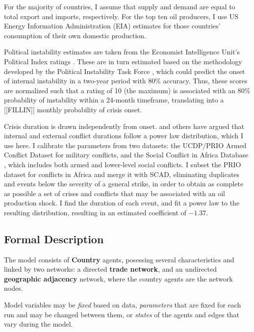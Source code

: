 \documentclass{article}
\begin{document}
For the majority of countries, I assume that supply and demand are equal to total export and imports, respectively. For the top ten oil producers, I use US Energy Information Administration (EIA) estimates \citep{eia_2013} for those countries' consumption of their own domestic production. 

Political instability estimates are taken from the Economist Intelligence Unit's Political Index ratings \citep{eiu_2013}. These are in turn estimated based on the methodology developed by the Political Instability Task Force \citep{goldstone_2005}, which could predict the onset of internal instability in a two-year period with 80\% accuracy. Thus, these scores are normalized such that a rating of 10 (the maximum) is associated with an 80\% probability of instability within a 24-month timeframe, translating into a [[FILLIN]] monthly probability of crisis onset.

Crisis duration is drawn independently from onset. \citet{cioffi_2004} and others have argued that internal and external conflict durations follow a power law distribution, which I use here. I calibrate the parameters from two datasets: the UCDP/PRIO Armed Conflict Dataset \citep{lotta_2013} for military conflicts, and the Social Conflict in Africa Database \citep{hendrix_2013}, which includes both armed and lower-level social conflicts. I subset the PRIO dataset for conflicts in Africa and merge it with SCAD, eliminating duplicates and events below the severity of a general strike, in order to obtain as complete as possible a set of crises and conflicts that may be associated with an oil production  shock. I find the duration of each event, and fit a power law to the resulting distribution, resulting in an estimated coefficient of $\mathbf{-1.37}$.

\subsection{Formal Description}

The model consists of \textbf{Country} agents, posessing several characteristics and linked by two networks: a directed \textbf{trade network}, and an undirected \textbf{geographic adjacency} network, where the country agents are the network nodes.

Model variables may be \emph{fixed} based on data, \emph{parameters} that are fixed for each run and may be changed between them, or \emph{states} of the agents and edges that vary during the model.
\end{document}
